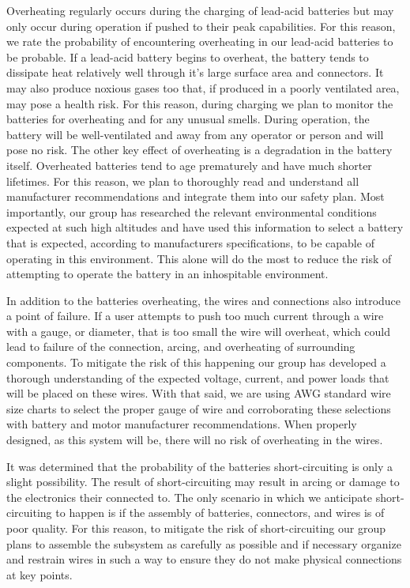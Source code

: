 Overheating regularly occurs during the charging of lead-acid batteries but may only occur during operation if pushed to their peak capabilities. For this reason, we rate the probability of encountering overheating in our lead-acid batteries to be probable. If a lead-acid battery begins to overheat, the battery tends to dissipate heat relatively well through it's large surface area and connectors. It may also produce noxious gases too that, if produced in a poorly ventilated area, may pose a health risk. For this reason, during charging we plan to monitor the batteries for overheating and for any unusual smells. During operation, the battery will be well-ventilated and away from any operator or person and will pose no risk. The other key effect of overheating is a degradation in the battery itself. Overheated batteries tend to age prematurely and have much shorter lifetimes. For this reason, we plan to thoroughly read and understand all manufacturer recommendations and integrate them into our safety plan. Most importantly, our group has researched the relevant environmental conditions expected at such high altitudes and have used this information to select a battery that is expected, according to manufacturers specifications, to be capable of operating in this environment. This alone will do the most to reduce the risk of attempting to operate the battery in an inhospitable environment. 

In addition to the batteries overheating, the wires and connections also introduce a point of failure. If a user attempts to push too much current through a wire with a gauge, or diameter, that is too small the wire will overheat, which could lead to failure of the connection, arcing, and overheating of surrounding components. To mitigate the risk of this happening our group has developed a thorough understanding of the expected voltage, current, and power loads that will be placed on these wires. With that said, we are using AWG standard wire size charts to select the proper gauge of wire and corroborating these selections with battery and motor manufacturer recommendations. When properly designed, as this system will be, there will no risk of overheating in the wires. 

It was determined that the probability of the batteries short-circuiting is only a slight possibility. The result of short-circuiting may result in arcing or damage to the electronics their connected to. The only scenario in which we anticipate short-circuiting to happen is if the assembly of batteries, connectors, and wires is of poor quality. For this reason, to mitigate the risk of short-circuiting our group plans to assemble the subsystem as carefully as possible and if necessary organize and restrain wires in such a way to ensure they do not make physical connections at key points. 

